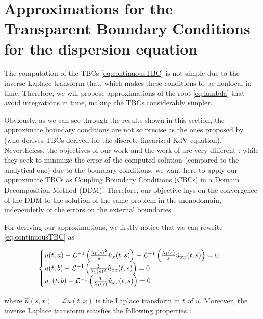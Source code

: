 \section{Approximations for the Transparent Boundary Conditions for the dispersion equation}
\label{sec:approxTBC}

\indent The computation of the TBCs \eqref{eq:continuousTBC} is not simple due to the inverse Laplace transform that, which makes these conditions to be nonlocal in time. Therefore, we will propose approximations of the root \eqref{eq:lambda} that avoid integrations in time, making the TBCs considerably simpler.

\indent Obviously, as we can see through the results shown in this section, the approximate boundary conditions are not so precise as the ones proposed by \cite{besse2015} (who derives TBCs derived for the discrete linearized KdV equation). Nevertheless, the objectives of our work and the work of \cite{besse2015} are very different : while they seek to minimize the error of the computed solution (compared to the analytical one) due to the boundary conditions, we want here to apply our approximate TBCs as Coupling Boundary Conditions (CBCs) in a Domain Decomposition Method (DDM). Therefore, our objective lays on the convergence of the DDM to the solution of the same problem in the monodomain, independetly of the errors on the external boundaries. 

\indent For deriving our approximations, we firstly notice that we can rewrite \eqref{eq:continuousTBC} as

\begin{gather}
\label{eq:TBCnoConvolution}
    \begin{cases}
        u(t,a) - \mathcal{L}^{-1} \left( \frac{\lambda_1(s)^2}{s} \hat{u}_x(t,s) \right)  - \mathcal{L}^{-1} \left( \frac{\lambda_1(s)}{s}  \hat{u}_{xx}(t,s) \right) = 0 \\
        u(t,b) - \mathcal{L}^{-1} \left( \frac{1}{\lambda_1(s)^2}   \hat{u}_{xx}(t,s) \right) = 0 \\
        u_x(t,b) - \mathcal{L}^{-1} \left( \frac{1}{\lambda_1(s)}   \hat{u}_{xx}(t,s) \right) = 0 
    \end{cases}
\end{gather}

\noindent where $\hat{u}(s,x) = \mathcal{L}u(t,x)$ is the Laplace transform in $t$ of $u$.  Moreover, the inverse Laplace transform satisfies the following properties \cite{laplaceTransform}:

